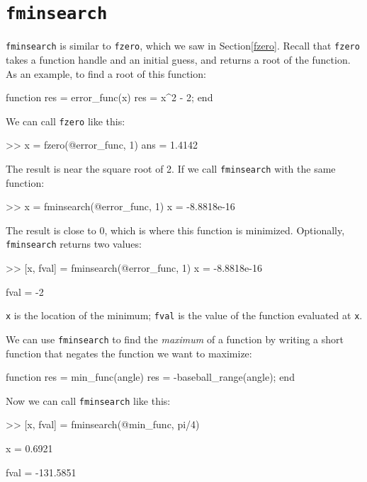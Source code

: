 \section{{\tt fminsearch}}

{\tt fminsearch} is similar to {\tt fzero}, which we saw in Section\ref{fzero}.  Recall that {\tt fzero} takes a function handle and an initial guess, and returns a root of the function.
As an example, to find a root of this function:


\begin{code}
function res = error_func(x)
    res = x^2 - 2;
end
\end{code}

We can call {\tt fzero} like this:

\begin{code}
>> x = fzero(@error_func, 1)
ans = 1.4142
\end{code}

The result is near the square root of 2.  If we call {\tt fminsearch} with the same function:

\begin{code}
>> x = fminsearch(@error_func, 1)
x = -8.8818e-16
\end{code}

The result is close to 0, which is where this function is minimized.  Optionally, {\tt fminsearch} returns two values:

\begin{code}
>> [x, fval] = fminsearch(@error_func, 1)
x = -8.8818e-16

fval = -2
\end{code}

{\tt x} is the location of the minimum; {\tt fval} is the value of the function evaluated at {\tt x}.

We can use {\tt fminsearch} to find the {\em maximum} of a function by writing a short function that negates the function we want to maximize:

\begin{code}
function res = min_func(angle)
    res = -baseball_range(angle);
end
\end{code}

Now we can call {\tt fminsearch} like this:

\begin{code}
>> [x, fval] = fminsearch(@min_func, pi/4)

x = 0.6921

fval = -131.5851
\end{code}

